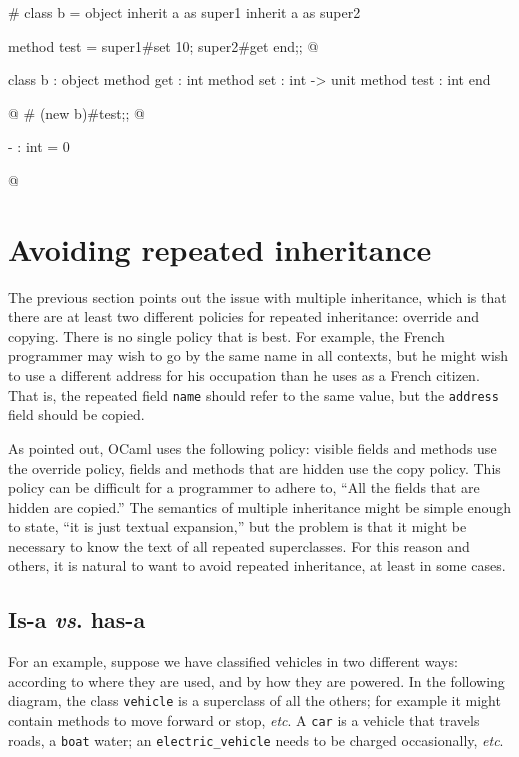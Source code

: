 \begin{ocaml}
# class b =
  object
     inherit a as super1
     inherit a as super2

     method test =
        super1#set 10;
        super2#get
  end;;
@
\begin{topoutput}
class b :
  object method get : int method set : int -> unit method test : int end
\end{topoutput}
@
# (new b)#test;;
@
\begin{topoutput}
- : int = 0
\end{topoutput}
@
\end{ocaml}

\section{Avoiding repeated inheritance}

The previous section points out the issue with multiple inheritance, which is that there
are at least two different policies for repeated inheritance: override and copying.
There is no single policy that is best.  For example, the French programmer
may wish to go by the same name in all contexts, but he might wish to use a different address for
his occupation than he uses as a French citizen.  That is, the repeated field \hbox{\lstinline/name/}
should refer to the same value, but the \hbox{\lstinline/address/} field should be copied.

As pointed out, OCaml uses the following policy: visible fields and methods use the override policy,
fields and methods that are hidden use the copy policy.  This policy can be difficult for a
programmer to adhere to, ``All the fields that are hidden are copied.''  The semantics of multiple
inheritance might be simple enough to state, ``it is just textual expansion,'' but the problem is
that it might be necessary to know the text of all repeated superclasses.  For this reason and
others, it is natural to want to avoid repeated inheritance, at least in some cases.

\subsection{Is-a \emph{vs}.{} has-a}

For an example, suppose we have classified vehicles in two different ways: according to where they
are used, and by how they are powered.  In the following diagram, the class \hbox{\lstinline/vehicle/} is a
superclass of all the others; for example it might contain methods to move forward or
stop, \emph{etc}.  A \hbox{\lstinline/car/} is a vehicle that travels roads, a \hbox{\lstinline/boat/} water;
an \hbox{\lstinline/electric_vehicle/} needs to be charged occasionally, \emph{etc}.

